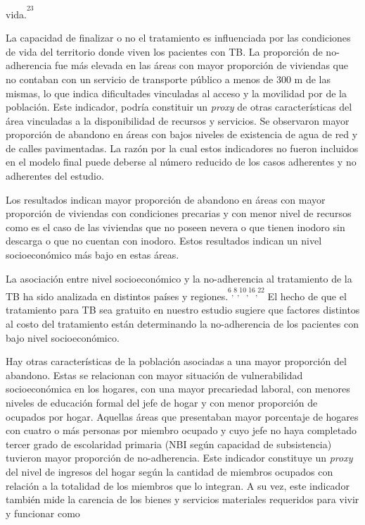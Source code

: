 \begin{multicols}{2}
vida.\allowbreak{}\textsuperscript{\textsuperscript{23}}\par{}La capacidad de finalizar o no el tratamiento es influenciada por las condiciones de vida del territorio donde viven los pacientes con TB.\allowbreak{} La proporción de no-\allowbreak{}adherencia fue más elevada en las áreas con mayor proporción de viviendas que no contaban con un servicio de transporte público a menos de 300 m de las mismas,\allowbreak{} lo que indica dificultades vinculadas al acceso y la movilidad por de la población.\allowbreak{} Este indicador,\allowbreak{} podría constituir un \textit{proxy} de otras características del área vinculadas a la disponibilidad de recursos y servicios.\allowbreak{} Se observaron mayor proporción de abandono en áreas con bajos niveles de existencia de agua de red y de calles pavimentadas.\allowbreak{} La razón por la cual estos indicadores no fueron incluidos en el modelo final puede deberse al número reducido de los casos adherentes y no adherentes del estudio.\allowbreak{}\par{}Los resultados indican mayor proporción de abandono en áreas con mayor proporción de viviendas con condiciones precarias y con menor nivel de recursos como es el caso de las viviendas que no poseen nevera o que tienen inodoro sin descarga o que no cuentan con inodoro.\allowbreak{} Estos resultados indican un nivel socioeconómico más bajo en estas áreas.\allowbreak{}\par{}La asociación entre nivel socioeconómico y la no-\allowbreak{}adherencia al tratamiento de la TB ha sido analizada en distintos países y regiones.\allowbreak{}\textsuperscript{\textsuperscript{6}}\textsuperscript{,\allowbreak{}}\textsuperscript{\textsuperscript{8}}\textsuperscript{,\allowbreak{}}\textsuperscript{\textsuperscript{10}}\textsuperscript{,\allowbreak{}}\textsuperscript{\textsuperscript{16}}\textsuperscript{,\allowbreak{}}\textsuperscript{\textsuperscript{22}} El hecho de que el tratamiento para TB sea gratuito en nuestro estudio sugiere que factores distintos al costo del tratamiento están determinando la no-\allowbreak{}adherencia de los pacientes con bajo nivel socioeconómico.\allowbreak{}\par{}Hay otras características de la población asociadas a una mayor proporción del abandono.\allowbreak{} Estas se relacionan con mayor situación de vulnerabilidad socioeconómica en los hogares,\allowbreak{} con una mayor precariedad laboral,\allowbreak{} con menores niveles de educación formal del jefe de hogar y con menor proporción de ocupados por hogar.\allowbreak{} Aquellas áreas que presentaban mayor porcentaje de hogares con cuatro o más personas por miembro ocupado y cuyo jefe no haya completado tercer grado de escolaridad primaria (\allowbreak{}NBI según capacidad de subsistencia)\allowbreak{} tuvieron mayor proporción de no-\allowbreak{}adherencia.\allowbreak{} Este indicador constituye un \textit{proxy} del nivel de ingresos del hogar según la cantidad de miembros ocupados con relación a la totalidad de los miembros que lo integran.\allowbreak{} A su vez,\allowbreak{} este indicador también mide la carencia de los bienes y servicios materiales requeridos para vivir y funcionar como 
\end{multicols}
